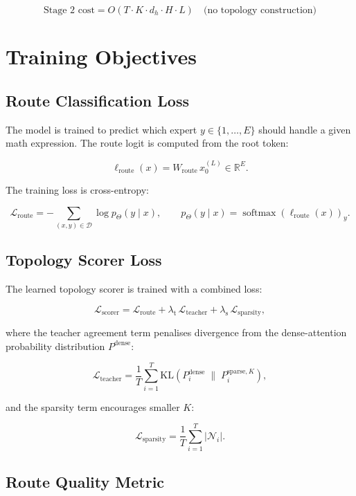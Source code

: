 \documentclass[11pt]{article}
\newcommand{\R}{\mathbb{R}}
\newcommand{\softmax}{\operatorname{softmax}}
\begin{document}
\[
\boxed{
  \text{Stage 2 cost} = O(T \cdot K \cdot d_h \cdot H \cdot L)
  \quad\text{(no topology construction)}
}
\]

\section*{Training Objectives}

\subsection*{Route Classification Loss}

The model is trained to predict which expert $y \in \{1,\ldots,E\}$
should handle a given math expression.
The route logit is computed from the root token:

\[
\ell_{\text{route}}(x) = W_{\text{route}}\, x_{0}^{(L)} \in \R^E.
\]

The training loss is cross-entropy:

\[
\mathcal{L}_{\text{route}}
= -\sum_{(x,y) \in \mathcal{D}} \log p_\Theta(y \mid x),
\qquad
p_\Theta(y \mid x) = \softmax(\ell_{\text{route}}(x))_y.
\]

\subsection*{Topology Scorer Loss}

The learned topology scorer is trained with a combined loss:

\[
\mathcal{L}_{\text{scorer}}
= \mathcal{L}_{\text{route}}
+ \lambda_{\text{t}}\,\mathcal{L}_{\text{teacher}}
+ \lambda_{\text{s}}\,\mathcal{L}_{\text{sparsity}},
\]

where the teacher agreement term penalises divergence from the
dense-attention probability distribution $P^{\text{dense}}$:

\[
\mathcal{L}_{\text{teacher}}
= \frac{1}{T}\sum_{i=1}^{T}
  \text{KL}\!\left(P_i^{\text{dense}} \;\Big\|\; P_i^{\text{sparse},K}\right),
\]

and the sparsity term encourages smaller $K$:

\[
\mathcal{L}_{\text{sparsity}}
= \frac{1}{T}\sum_{i=1}^{T} \left|\mathcal{N}_i\right|.
\]

\subsection*{Route Quality Metric}
\end{document}
